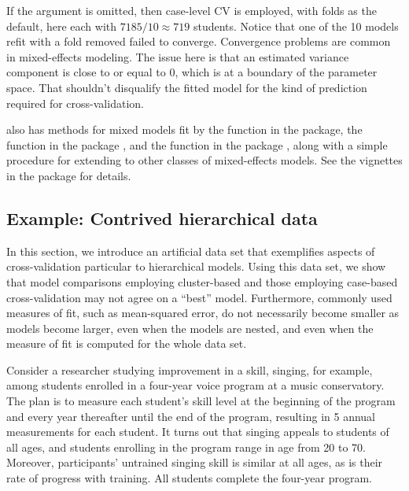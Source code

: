 \documentclass[
]{jss}
\begin{document}
If the  argument is omitted, then case-level CV
is employed, with  folds as the default, here each with
\(7185/10 \approx 719\) students. Notice that one of the 10 models refit
with a fold removed failed to converge. Convergence problems are common
in mixed-effects modeling. The issue here is that an estimated variance
component is close to or equal to 0, which is at a boundary of the
parameter space. That shouldn't disqualify the fitted model for the kind
of prediction required for cross-validation.

 also has methods for mixed models fit by the 
function in the  package, the  function in the
 package \citep{PinheiroBates:2000}, and the 
function in the  package \citep{BrooksEtAl}, along with a
simple procedure for extending  to other classes of
mixed-effects models. See the vignettes in the  package for
details.

\hypertarget{example-contrived-hierarchical-data}{%
\subsection{Example: Contrived hierarchical
data}\label{example-contrived-hierarchical-data}}

In this section, we introduce an artificial data set that exemplifies
aspects of cross-validation particular to hierarchical models. Using
this data set, we show that model comparisons employing cluster-based
and those employing case-based cross-validation may not agree on a
``best'' model. Furthermore, commonly used measures of fit, such as
mean-squared error, do not necessarily become smaller as models become
larger, even when the models are nested, and even when the measure of
fit is computed for the whole data set.

Consider a researcher studying improvement in a skill, singing, for
example, among students enrolled in a four-year voice program at a music
conservatory. The plan is to measure each student's skill level at the
beginning of the program and every year thereafter until the end of the
program, resulting in 5 annual measurements for each student. It turns
out that singing appeals to students of all ages, and students enrolling
in the program range in age from 20 to 70. Moreover, participants'
untrained singing skill is similar at all ages, as is their rate of
progress with training. All students complete the four-year program.
\end{document}
